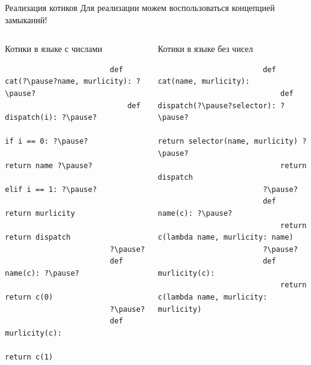     \begin{frame}[fragile]{Реализация котиков}
        Для реализации можем воспользоваться концепцией \pause замыканий!
        \pause
        \vspace{-1em}
        \begin{columns}[onlytextwidth]
            \begin{column}[t]{0.375\textwidth}
                \begin{block}{Котики в языке с числами}
                    \begin{verbatim}
                        def cat(?\pause?name, murlicity): ?\pause?
                            def dispatch(i): ?\pause?
                                if i == 0: ?\pause?
                                    return name ?\pause?
                                elif i == 1: ?\pause?
                                    return murlicity
                            return dispatch
                        ?\pause?
                        def name(c): ?\pause?
                            return c(0)
                        ?\pause?
                        def murlicity(c):
                            return c(1)
                    \end{verbatim}
                \end{block}
            \end{column}\hfill
            \pause%
            \begin{column}[t]{0.595\textwidth}
                \begin{block}{Котики в языке без чисел}
                    \begin{verbatim}
                        def cat(name, murlicity):
                            def dispatch(?\pause?selector): ?\pause?
                                return selector(name, murlicity) ?\pause?
                            return dispatch
                        ?\pause?
                        def name(c): ?\pause?
                            return c(lambda name, murlicity: name)
                        ?\pause?
                        def murlicity(c):
                            return c(lambda name, murlicity: murlicity)
                    \end{verbatim}
                \end{block}
            \end{column}
        \end{columns}
    \end{frame}

